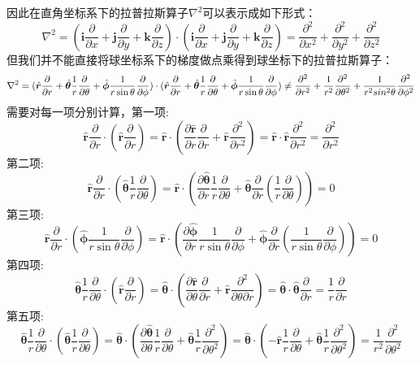 因此在直角坐标系下的拉普拉斯算子$\nabla^2$可以表示成如下形式：
\[\nabla^2=(\bm{i}\frac{\partial}{\partial{x}}+\bm{j}\frac{\partial}{\partial{y}}+\bm{k}\frac{\partial}{\partial{z}}) \cdot (\bm{i}\frac{\partial}{\partial{x}}+\bm{j}\frac{\partial}{\partial{y}}+\bm{k}\frac{\partial}{\partial{z}})=\frac{\partial^2}{\partial{x}^2}+\frac{\partial^2}{\partial{y}^2}+\frac{\partial^2}{\partial{z}^2}\]
但我们并不能直接将球坐标系下的梯度做点乘得到球坐标下的拉普拉斯算子：
\[\nabla^2=(\hat{\bm{r}}\pdv{r}+\hat{\bm{\theta}}\frac{1}{r}\pdv{\theta}+\hat{\bm{\phi}}\frac{1}{r\sin\theta}\pdv{\phi}) \cdot (\hat{\bm{r}}\pdv{r}+\hat{\bm{\theta}}\frac{1}{r}\pdv{\theta}+\hat{\bm{\phi}}\frac{1}{r\sin\theta}\pdv{\phi}) \neq \frac{\partial^2}{\partial{r^2}}+\frac{1}{r^2}\frac{\partial^2}{\partial{\theta^2}}+\frac{1}{r^2sin^2 \theta }\frac{\partial^2}{\partial{\phi^2}}\]
需要对每一项分别计算，第一项:
\[
\hat{\mathbf{r}}\frac{\partial}{\partial r} \cdot \left(\hat{\mathbf{r}}\frac{\partial}{\partial r}\right) = \hat{\mathbf{r}} \cdot \left(\frac{\partial\hat{\mathbf{r}}}{\partial r}\frac{\partial}{\partial r} + \hat{\mathbf{r}}\frac{\partial^2}{\partial r^2}\right) = \hat{\mathbf{r}} \cdot \hat{\mathbf{r}}\frac{\partial^2}{\partial r^2} = \frac{\partial^2}{\partial r^2}
\]
第二项:
\[
\hat{\mathbf{r}}\frac{\partial}{\partial r} \cdot \left(\hat{\boldsymbol{\theta}}\frac{1}{r}\frac{\partial}{\partial \theta}\right) = \hat{\mathbf{r}} \cdot \left(\frac{\partial\hat{\boldsymbol{\theta}}}{\partial r}\frac{1}{r}\frac{\partial}{\partial \theta} + \hat{\boldsymbol{\theta}}\frac{\partial}{\partial r}\left(\frac{1}{r}\frac{\partial}{\partial \theta}\right)\right) = 0
\]
第三项:
\[
\hat{\mathbf{r}}\frac{\partial}{\partial r} \cdot \left(\hat{\boldsymbol{\phi}}\frac{1}{r\sin\theta}\frac{\partial}{\partial \phi}\right) = \hat{\mathbf{r}} \cdot \left(\frac{\partial\hat{\boldsymbol{\phi}}}{\partial r}\frac{1}{r\sin\theta}\frac{\partial}{\partial \phi} + \hat{\boldsymbol{\phi}}\frac{\partial}{\partial r}\left(\frac{1}{r\sin\theta}\frac{\partial}{\partial \phi}\right)\right) = 0
\]
第四项:
\[
\hat{\boldsymbol{\theta}}\frac{1}{r}\frac{\partial}{\partial \theta} \cdot \left(\hat{\mathbf{r}}\frac{\partial}{\partial r}\right) = \hat{\boldsymbol{\theta}} \cdot \left(\frac{\partial\hat{\mathbf{r}}}{\partial \theta}\frac{\partial}{\partial r} + \hat{\mathbf{r}}\frac{\partial^2}{\partial\theta\partial r}\right) = \hat{\boldsymbol{\theta}} \cdot \hat{\boldsymbol{\theta}}\frac{\partial}{\partial r} = \frac{1}{r}\frac{\partial}{\partial r}
\]
第五项:
\[
\hat{\boldsymbol{\theta}}\frac{1}{r}\frac{\partial}{\partial \theta} \cdot \left(\hat{\boldsymbol{\theta}}\frac{1}{r}\frac{\partial}{\partial \theta}\right) = \hat{\boldsymbol{\theta}} \cdot \left(\frac{\partial\hat{\boldsymbol{\theta}}}{\partial \theta}\frac{1}{r}\frac{\partial}{\partial \theta} + \hat{\boldsymbol{\theta}}\frac{1}{r}\frac{\partial^2}{\partial\theta^2}\right) = \hat{\boldsymbol{\theta}} \cdot \left(-\hat{\mathbf{r}}\frac{1}{r}\frac{\partial}{\partial \theta} + \hat{\boldsymbol{\theta}}\frac{1}{r}\frac{\partial^2}{\partial\theta^2}\right) = \frac{1}{r^2}\frac{\partial^2}{\partial\theta^2}
\]
